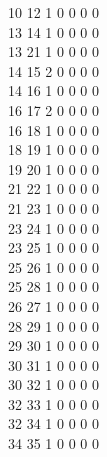 \documentclass[11pt,titlepage,dvipdfmx,twoside]{article}
\begin{document}
\begin{oframed}
{ 10 12  1  0  0  0  0                                                      \\
 13 14  1  0  0  0  0                                                      \\
 13 21  1  0  0  0  0                                                      \\
 14 15  2  0  0  0  0                                                      \\
 14 16  1  0  0  0  0                                                      \\
 16 17  2  0  0  0  0                                                      \\
 16 18  1  0  0  0  0                                                      \\
 18 19  1  0  0  0  0                                                      \\
 19 20  1  0  0  0  0                                                      \\
 21 22  1  0  0  0  0                                                      \\
 21 23  1  0  0  0  0                                                      \\
 23 24  1  0  0  0  0                                                      \\
 23 25  1  0  0  0  0                                                      \\
 25 26  1  0  0  0  0                                                      \\
 25 28  1  0  0  0  0                                                      \\
 26 27  1  0  0  0  0                                                      \\
 28 29  1  0  0  0  0                                                      \\
 29 30  1  0  0  0  0                                                      \\
 30 31  1  0  0  0  0                                                      \\
 30 32  1  0  0  0  0                                                      \\
 32 33  1  0  0  0  0                                                      \\
 32 34  1  0  0  0  0                                                      \\
 34 35  1  0  0  0  0                                                      \\
}
\end{oframed}
\end{document}
